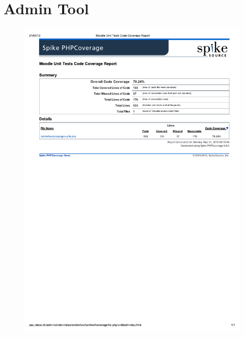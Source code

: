 \section{Admin Tool}
\label{app:admincc}
\begin{figure}[H]
	\centering
		\includegraphics[trim=0cm 15cm 0cm 0cm,clip=true,width=\textwidth]{images/adminprojectgroupccreport.pdf}
	\label{fig:adminprojectgroupccreport}
\end{figure}

\newpage{}